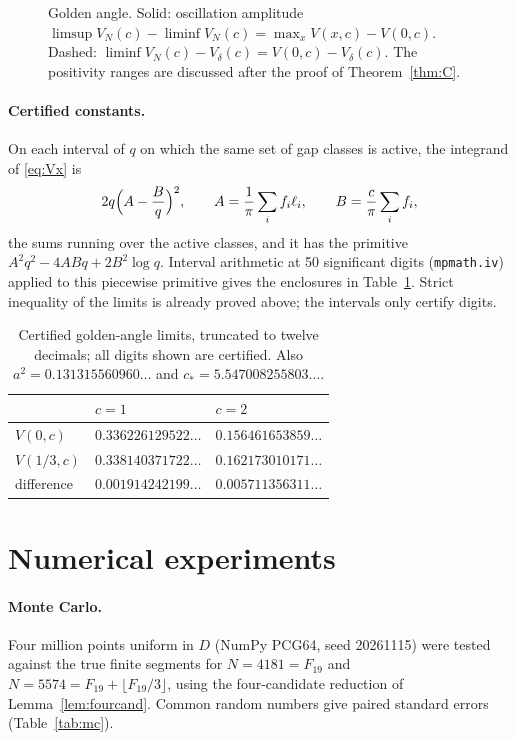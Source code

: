 \documentclass[11pt]{amsart}
\theoremstyle{remark}
\newcommand{\Vd}{V_\delta}
\begin{document}
\begin{figure}[t]
\centering
\begin{tikzpicture}[scale=0.85]

\end{tikzpicture}
\caption{Golden angle. Solid: oscillation amplitude $\limsup V_N(c)-\liminf V_N(c)=\max_xV(x,c)-V(0,c)$. Dashed: $\liminf V_N(c)-\Vd(c)=V(0,c)-\Vd(c)$. The positivity ranges are discussed after the proof of Theorem~\ref{thm:C}.}
\label{fig:threshold}
\end{figure}

\paragraph{Certified constants.}
On each interval of $q$ on which the same set of gap classes is active, the integrand of
\eqref{eq:Vx} is
\[
2q\Bigl(A-\frac Bq\Bigr)^2,\qquad A=\frac1\pi\sum_i f_i\ell_i,\qquad B=\frac c\pi\sum_i f_i ,
\]
the sums running over the active classes, and it has the primitive $A^2q^2-4ABq+2B^2\log q$.
Interval arithmetic at 50 significant digits (\texttt{mpmath.iv}) applied to this
piecewise primitive gives the enclosures in Table~\ref{tab:limits}. Strict inequality of
the limits is already proved above; the intervals only certify digits.

\begin{table}[t]
\centering
\begin{tabular}{@{}lll@{}}
\toprule
& $c=1$ & $c=2$\\
\midrule
$V(0,c)$ & $0.336226129522\ldots$ & $0.156461653859\ldots$\\
$V(1/3,c)$ & $0.338140371722\ldots$ & $0.162173010171\ldots$\\
difference & $0.001914242199\ldots$ & $0.005711356311\ldots$\\
\bottomrule
\end{tabular}
\caption{Certified golden-angle limits, truncated to twelve decimals; all digits shown are certified. Also $a^2=0.131315560960\ldots$ and $c_*=5.547008255803\ldots$.}
\label{tab:limits}
\end{table}



\section{Numerical experiments}\label{sec:numerics}

\paragraph{Monte Carlo.} Four million points uniform in $D$ (NumPy PCG64, seed
20261115) were tested against the true finite segments for $N=4181=F_{19}$ and
$N=5574=F_{19}+\lfloor F_{19}/3\rfloor$, using the four-candidate reduction of Lemma~\ref{lem:fourcand}. Common random numbers
give paired standard errors (Table~\ref{tab:mc}).
\end{document}
